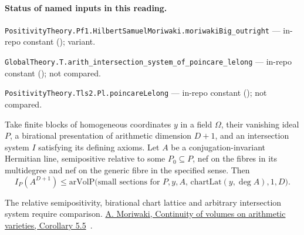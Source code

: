 

\paragraph{Status of named inputs in this reading.}
\noindent\nolinkurl{PositivityTheory.Pf1.HilbertSamuelMoriwaki.moriwakiBig_outright} --- in-repo constant (); variant.\par
\noindent\nolinkurl{GlobalTheory.T.arith_intersection_system_of_poincare_lelong} --- in-repo constant (); not compared.\par
\noindent\nolinkurl{PositivityTheory.Tls2.Pl.poincareLelong} --- in-repo constant (); not compared.\par

\begin{formalstatement}\label{sub:T17}

Take finite blocks of homogeneous coordinates $y$ in a field $\Omega$,
their vanishing ideal $P$, a birational presentation of arithmetic dimension
$D+1$, and an intersection system $I$ satisfying its defining axioms.
Let $A$ be a conjugation-invariant Hermitian line, semipositive relative
to some $P_0\subseteq P$, nef on the fibres in its multidegree and nef on
the generic fibre in the specified sense. Then
\[
 I_P(A^{D+1})\le
 \mathrm{arVolP}\bigl(\text{small sections for }P,y,A,\,
       \mathrm{chartLat}(y,\deg A),1,D\bigr).
\]

\end{formalstatement}

\noindent The relative semipositivity, birational chart lattice and arbitrary intersection system require comparison. \href{https://arxiv.org/pdf/math/0612269}{A. Moriwaki, Continuity of volumes on arithmetic varieties, Corollary 5.5}~\cite{r21-moriwaki}.

